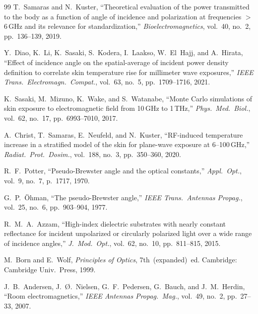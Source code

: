 \documentclass[11pt,a4paper]{article}
\theoremstyle{definition}      %
\begin{document}
\begin{thebibliography}{99}
  T.~Samaras and N.~Kuster, ``Theoretical evaluation of the power transmitted
  to the body as a function of angle of incidence and polarization at
  frequencies ${>}$6\,GHz and its relevance for standardization,''
  \textit{Bioelectromagnetics}, vol.~40, no.~2, pp.~136--139, 2019.

  Y.~Diao, K.~Li, K.~Sasaki, S.~Kodera, I.~Laakso, W.~El~Hajj, and
  A.~Hirata, ``Effect of incidence angle on the spatial-average of incident
  power density definition to correlate skin temperature rise for millimeter
  wave exposures,'' \textit{IEEE Trans.\ Electromagn.\ Compat.}, vol.~63,
  no.~5, pp.~1709--1716, 2021.

  K.~Sasaki, M.~Mizuno, K.~Wake, and S.~Watanabe, ``Monte Carlo simulations
  of skin exposure to electromagnetic field from 10\,GHz to 1\,THz,''
  \textit{Phys.\ Med.\ Biol.}, vol.~62, no.~17, pp.~6993--7010, 2017.

  A.~Christ, T.~Samaras, E.~Neufeld, and N.~Kuster, ``RF-induced temperature
  increase in a stratified model of the skin for plane-wave exposure at
  6--100\,GHz,'' \textit{Radiat.\ Prot.\ Dosim.}, vol.~188, no.~3,
  pp.~350--360, 2020.

  R.~F.~Potter, ``Pseudo-{Brewster} angle and the optical constants,''
  \textit{Appl.\ Opt.}, vol.~9, no.~7, p.~1717, 1970.

  G.~P.~\"{O}hman, ``The pseudo-{Brewster} angle,'' \textit{IEEE Trans.\
  Antennas Propag.}, vol.~25, no.~6, pp.~903--904, 1977.

  R.~M.~A.~Azzam, ``High-index dielectric substrates with nearly constant
  reflectance for incident unpolarized or circularly polarized light over a
  wide range of incidence angles,'' \textit{J.\ Mod.\ Opt.}, vol.~62, no.~10,
  pp.~811--815, 2015.

  M.~Born and E.~Wolf, \textit{Principles of Optics}, 7th~(expanded)~ed.
  Cambridge: Cambridge Univ.\ Press, 1999.

  J.~B.~Andersen, J.~{\O}.~Nielsen, G.~F.~Pedersen, G.~Bauch, and
  J.~M.~Herdin, ``Room electromagnetics,'' \textit{IEEE Antennas Propag.\
  Mag.}, vol.~49, no.~2, pp.~27--33, 2007.
  \doi{10.1109/MAP.2007.376642}


\end{thebibliography}
\end{document}
